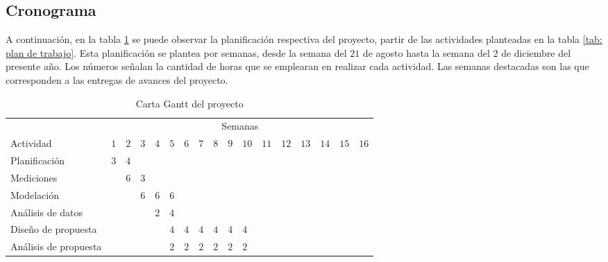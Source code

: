 \subsection{Cronograma}
\noindent A continuación, en la tabla \ref{tab: carta gantt} se puede observar la planificación respectiva del proyecto, partir de las actividades planteadas en la tabla \ref{tab: plan de trabajo}. Esta planificación se plantea por semanas, desde la semana del $21$ de agosto hasta la semana del $2$ de diciembre del presente año. Los números señalan la cantidad de horas que se emplearan en realizar cada actividad. Las semanas destacadas son las que corresponden a las entregas de avances del proyecto.
\begin{table}[H]
\centering
\caption{Carta Gantt del proyecto}
\label{tab: carta gantt}
\resizebox{16cm}{!} {
\begin{tabular}{|l|llllllllllllllll|}
\hline
 & \multicolumn{16}{c|}{Semanas} \\ \cline{2-17} 
\multirow{-2}{*}{Actividad} & $1$ & \cellcolor[HTML]{FABF8F}$2$ & $3$ & {\cellcolor[HTML]{FABF8F}$4$} & $5$ & $6$ & $7$ & {\cellcolor[HTML]{FABF8F}$8$} & $9$ & $10$ & \cellcolor[HTML]{FABF8F}$11$ & \multicolumn{1}{l}{$12$} & $13$ & $14$ & \multicolumn{1}{|l|}{\cellcolor[HTML]{FABF8F}$15$} & \cellcolor[HTML]{FABF8F}$16$ \\ \hline
Planificación & \cellcolor[HTML]{4F81BD}$3$ & \cellcolor[HTML]{4F81BD}$4$ &  &  &  &  &  &  &  &  &  &  &  &  & \multicolumn{1}{|l|}{} &  \\
Mediciones &  & \cellcolor[HTML]{4F81BD}$6$ & {\cellcolor[HTML]{4F81BD}$3$} &  &  &  &  &  &  &  &  &  &  &  & \multicolumn{1}{|l|}{} &  \\
Modelación &  &  & {\cellcolor[HTML]{4F81BD}$6$} & {\cellcolor[HTML]{4F81BD}$6$} & \cellcolor[HTML]{4F81BD}$6$ &  &  &  &  &  &  &  &  &  & \multicolumn{1}{|l|}{} &  \\
Análisis de datos &  &  &  & {\cellcolor[HTML]{C0504D}$2$} & \cellcolor[HTML]{C0504D}$4$ &  &  &   &  &  &  &  &  &  & \multicolumn{1}{|l|}{} &  \\
Diseño de propuesta &  &  &  &  & \cellcolor[HTML]{C0504D}$4$ & \cellcolor[HTML]{C0504D}$4$ & \cellcolor[HTML]{C0504D}$4$ & {\cellcolor[HTML]{C0504D}$4$} & \cellcolor[HTML]{C0504D}$4$ & \cellcolor[HTML]{C0504D}$4$ &  &  &  &  & \multicolumn{1}{|l|}{} &  \\
Análisis de propuesta &  &  &  &  & \cellcolor[HTML]{C0504D}$2$ & \cellcolor[HTML]{C0504D}$2$ & \cellcolor[HTML]{C0504D}$2$ & {\cellcolor[HTML]{C0504D}$2$} & \cellcolor[HTML]{C0504D}$2$ & \cellcolor[HTML]{C0504D}$2$ &  &  &  &  & \multicolumn{1}{|l|}{} &  \\

\end{tabular}}
\end{table}
